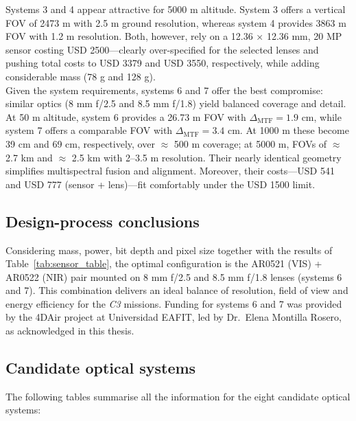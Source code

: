 \noindent Systems 3 and 4 appear attractive for 5000 m altitude.  System 3 offers
a vertical FOV of 2473 m with 2.5 m ground resolution, whereas system 4
provides 3863 m FOV with 1.2 m resolution. Both, however, rely on a
12.36 × 12.36 mm, 20 MP sensor costing USD 2500—clearly over-specified
for the selected lenses and pushing total costs to USD 3379 and
USD 3550, respectively, while adding considerable mass (78 g and
128 g).\\

\noindent Given the system requirements, systems 6 and 7 offer the best
compromise: similar optics (8 mm f/2.5 and 8.5 mm f/1.8) yield balanced
coverage and detail. At 50 m altitude, system 6 provides a 26.73 m FOV
with \(\Delta_{\mathrm{MTF}}=1.9\) cm, while system 7 offers a comparable
FOV with \(\Delta_{\mathrm{MTF}}=3.4\) cm. At 1000 m these become 39 cm
and 69 cm, respectively, over $\approx$ 500 m coverage; at 5000 m, FOVs of
$\approx$ 2.7 km and $\approx$ 2.5 km with 2–3.5 m resolution. Their nearly identical
geometry simplifies multispectral fusion and alignment. Moreover, their
costs—USD 541 and USD 777 (sensor + lens)—fit comfortably under the
USD 1500 limit.\\

\subsection{Design-process conclusions}

Considering mass, power, bit depth and pixel size together with the
results of Table~\ref{tab:sensor_table}, the optimal configuration is
the AR0521 (VIS) + AR0522 (NIR) pair mounted on 8 mm f/2.5 and
8.5 mm f/1.8 lenses (systems 6 and 7). This combination delivers an
ideal balance of resolution, field of view and energy efficiency for the
\textit{C3} missions. Funding for systems 6 and 7 was provided by the
4DAir project at Universidad EAFIT, led by Dr.\ Elena Montilla Rosero, as
acknowledged in this thesis.\\

\subsection{Candidate optical systems}%
\label{ap:sistemas_candidatos} 

The following tables summarise all the information for the eight
candidate optical systems:



